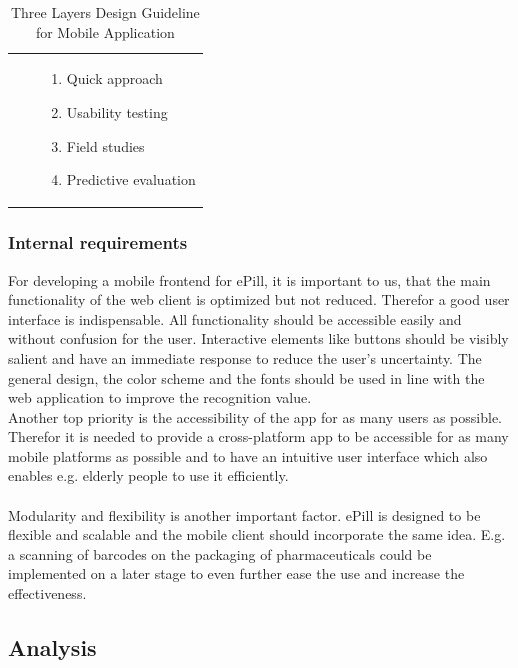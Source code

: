\begin{table}[!htb]
\begin{tabular}{c | c | p{23.5em}}
        \cline{3-3}
        & & 
            \begin{enumerate}
                \item Quick approach
                \item Usability testing
                \item Field studies
                \item Predictive evaluation
            \end{enumerate}
        \\
    \end{tabular}
    \caption[Three Layers Design Guideline for Mobile Application]{Three Layers Design Guideline for Mobile Application\footnotemark}
    \label{tab:ThreeLayersDesignGuideline}
\end{table}

\subsubsection{Internal requirements}
For developing a mobile frontend for ePill, it is important to us, that the main functionality of the web client is optimized but not reduced. Therefor a good user interface is indispensable. All functionality should be accessible easily and without confusion for the user. Interactive elements like buttons should be visibly salient and have an immediate response to reduce the user's uncertainty. The general design, the color scheme and the fonts should be used in line with the web application to improve the recognition value. 
\\
Another top priority is the accessibility of the app for as many users as possible. Therefor it is needed to provide a cross-platform app to be accessible for as many mobile platforms as possible and to have an intuitive user interface which also enables e.g. elderly people to use it efficiently.
\\
\\
Modularity and flexibility is another important factor. ePill is designed to be flexible and scalable and the mobile client should incorporate the same idea. E.g. a scanning of barcodes on the packaging of pharmaceuticals could be implemented on a later stage to even further ease the use and increase the effectiveness.
\subsection{Analysis}
\label{subsec:Analysis}
